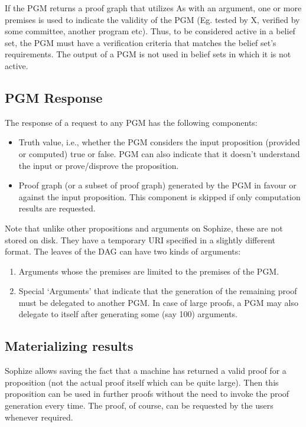 \documentclass[runningheads]{llncs}
\begin{document}
If the PGM returns a proof graph that utilizes As with an argument, one or more premises is used to indicate the validity of the PGM (Eg. tested by X, verified by some committee, another program etc). Thus, to be considered active in a belief set, the PGM must have a verification criteria that matches the belief set's requirements. The output of a PGM is not used in belief sets in which it is not active.

\subsection{PGM Response}
The response of a request to any PGM has the following components:

\begin{itemize}

\item Truth value, i.e., whether the PGM considers the input proposition (provided or computed) true or false. PGM can also indicate that it doesn't understand the input or prove/disprove the proposition.

\item Proof graph (or a subset of proof graph) generated by the PGM in favour or against the input proposition. This component is skipped if only computation results are requested.
\end{itemize}

Note that unlike other propositions and arguments on Sophize, these are not stored on disk. They have a temporary URI specified in a slightly different format. The leaves of the DAG can have two kinds of arguments:

\begin{enumerate}
\item Arguments whose the premises are limited to the premises of the PGM.
\item Special `Arguments' that indicate that the generation of the remaining proof must be delegated to another PGM. In case of large proofs, a PGM may also delegate to itself after generating some (say 100) arguments.
\end{enumerate}
\subsection{Materializing results}

Sophize allows saving the fact that a machine has returned a valid proof for a proposition (not the actual proof itself which can be quite large). Then this proposition can be used in further proofs without the need to invoke the proof generation every time. The proof, of course, can be requested by the users whenever required.
\end{document}
